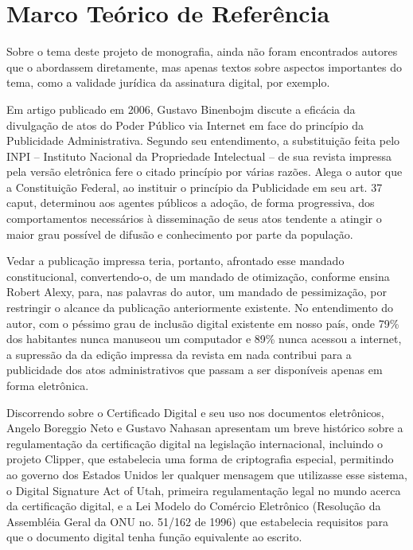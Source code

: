 \chapter{Marco Teórico de Referência}
	Sobre o tema deste projeto de monografia, ainda não foram
  encontrados autores que o abordassem diretamente, mas apenas
  textos sobre aspectos importantes do tema, como a validade
  jurídica da assinatura digital, por exemplo.\par
	
	Em artigo publicado em 2006, Gustavo Binenbojm discute a
  eficácia da divulgação de atos do Poder Público via Internet em
  face do princípio da Publicidade Administrativa. Segundo seu
  entendimento, a substituição feita pelo INPI – Instituto
  Nacional da Propriedade Intelectual – de sua revista impressa
  pela versão eletrônica fere o citado princípio por várias
  razões. Alega o autor que a Constituição Federal, ao instituir
  o princípio da Publicidade em seu art. 37 caput, determinou aos
  agentes públicos a adoção, de forma progressiva, dos
  comportamentos necessários à disseminação de seus atos tendente
  a atingir o maior grau possível de difusão e conhecimento por
  parte da população. \par
	
	Vedar a publicação impressa teria, portanto, afrontado esse
  mandado constitucional, convertendo-o, de um mandado de
  otimização, conforme ensina Robert Alexy, para, nas palavras do
  autor, um mandado de pessimização, por restringir o alcance da
  publicação anteriormente existente.  No entendimento do autor,
  com o péssimo grau de inclusão digital existente em nosso país,
  onde 79\% dos habitantes nunca manuseou um computador e 89\%
  nunca acessou a internet, a supressão da da edição impressa da
  revista em nada contribui para a publicidade dos atos
  administrativos que passam a ser disponíveis apenas em forma
  eletrônica. \par
	
	Discorrendo sobre o Certificado Digital e seu uso nos
  documentos eletrônicos, Angelo Boreggio Neto e Gustavo Nahasan
  apresentam um breve histórico sobre a regulamentação da
  certificação digital na legislação internacional, incluindo o
  projeto Clipper, que estabelecia uma forma de criptografia
  especial, permitindo ao governo dos Estados Unidos ler qualquer
  mensagem que utilizasse esse sistema, o Digital Signature Act
  of Utah, primeira regulamentação legal no mundo acerca da
  certificação digital, e a Lei Modelo do Comércio Eletrônico
  (Resolução da Assembléia Geral da ONU no. 51/162 de 1996) que
  estabelecia requisitos para que o documento digital tenha
  função equivalente ao escrito. \par
	
